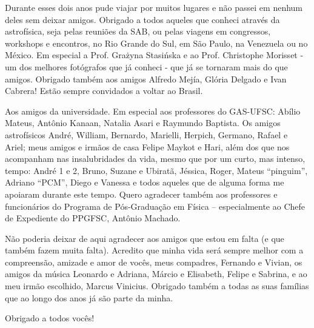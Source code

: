 Durante esses dois anos pude viajar por muitos lugares e não passei em nenhum deles sem deixar amigos. Obrigado a todos
aqueles que conheci através da astrofísica, seja pelas reuniões da SAB, ou pelas viagens em congressos, workshops
e encontros, no Rio Grande do Sul, em São Paulo, na Venezuela ou no México. Em especial a Prof. Gra\.zyna Stasi\'nska e ao
Prof. Christophe Morisset - um dos melhores fotógrafos que já conheci - que já se tornaram mais do que amigos. Obrigado
também aos amigos Alfredo Mejía, Glória Delgado e Ivan Cabrera! Estão sempre convidados a voltar ao Brasil.

Aos amigos da universidade. Em especial aos professores do GAS-UFSC: Abílio Mateus, Antônio Kanaan, Natalia Asari e
Raymundo Baptista. Os amigos astrofísicos André, William, Bernardo, Marielli, Herpich, Germano, Rafael e Ariel; meus
amigos e irmãos de casa Felipe Maykot e Hari, além dos que nos acompanham nas insalubridades da vida, mesmo que por um
curto, mas intenso, tempo: André 1 e 2, Bruno, Suzane e Ubiratã, Jéssica, Roger, Mateus ``pinguim'', Adriano ``PCM'',
Diego e Vanessa e todos aqueles que de alguma forma me apoiaram durante este tempo. Quero agradecer também aos
professores e funcionários do Programa de Pós-Graduação em Física – especialmente ao Chefe de Expediente do PPGFSC,
Antônio Machado.

Não poderia deixar de aqui agradecer aos amigos que estou em falta (e que também fazem muita falta). Acredito que minha
vida será sempre melhor com a compreensão, amizade e amor de vocês, meus compadres, Fernando e Vivian, os amigos da
música Leonardo e Adriana, Márcio e Elisabeth, Felipe e Sabrina, e ao meu irmão escolhido, Marcus Vinicius. Obrigado
também a todas as suas famílias que ao longo dos anos já são parte da minha.

Obrigado a todos vocês!

